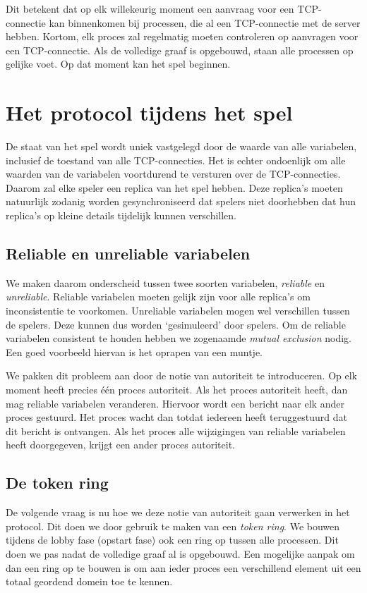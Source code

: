 \documentclass[a4paper,11pt]{article}
\begin{document}
    Dit betekent dat op elk willekeurig moment een aanvraag voor een TCP-connectie kan binnenkomen bij processen, die al een TCP-connectie met de server hebben. Kortom, elk proces zal regelmatig moeten controleren op aanvragen voor een TCP-connectie. Als de volledige graaf is opgebouwd, staan alle processen op gelijke voet. Op dat moment kan het spel beginnen.

    \section{Het protocol tijdens het spel}
    De staat van het spel wordt uniek vastgelegd door de waarde van alle variabelen, inclusief de toestand van alle TCP-connecties. Het is echter ondoenlijk om alle waarden van de variabelen voortdurend te versturen over de TCP-connecties. Daarom zal elke speler een replica van het spel hebben. Deze replica's moeten natuurlijk zodanig worden gesynchroniseerd dat spelers niet doorhebben dat hun replica's op kleine details tijdelijk kunnen verschillen.

    \subsection{Reliable en unreliable variabelen}
    We maken daarom onderscheid tussen twee soorten variabelen, \emph{reliable} en \emph{unreliable}. Reliable variabelen moeten gelijk zijn voor alle replica's om inconsistentie te voorkomen. Unreliable variabelen mogen wel verschillen tussen de spelers. Deze kunnen dus worden `gesimuleerd' door spelers. Om de reliable variabelen consistent te houden hebben we zogenaamde \emph{mutual exclusion} nodig. Een goed voorbeeld hiervan is het oprapen van een muntje.

    We pakken dit probleem aan door de notie van autoriteit te introduceren. Op elk moment heeft precies \'e\'en proces autoriteit. Als het proces autoriteit heeft, dan mag reliable variabelen veranderen. Hiervoor wordt een bericht naar elk ander proces gestuurd. Het proces wacht dan totdat iedereen heeft teruggestuurd dat dit bericht is ontvangen. Als het proces alle wijzigingen van reliable variabelen heeft doorgegeven, krijgt een ander proces autoriteit.

    \subsection{De token ring}
    De volgende vraag is nu hoe we deze notie van autoriteit gaan verwerken in het protocol. Dit doen we door gebruik te maken van een \emph{token ring}. We bouwen tijdens de lobby fase (opstart fase) ook een ring op tussen alle processen. Dit doen we pas nadat de volledige graaf al is opgebouwd. Een mogelijke aanpak om dan een ring op te bouwen is om aan ieder proces een verschillend element uit een totaal geordend domein toe te kennen.
\end{document}
